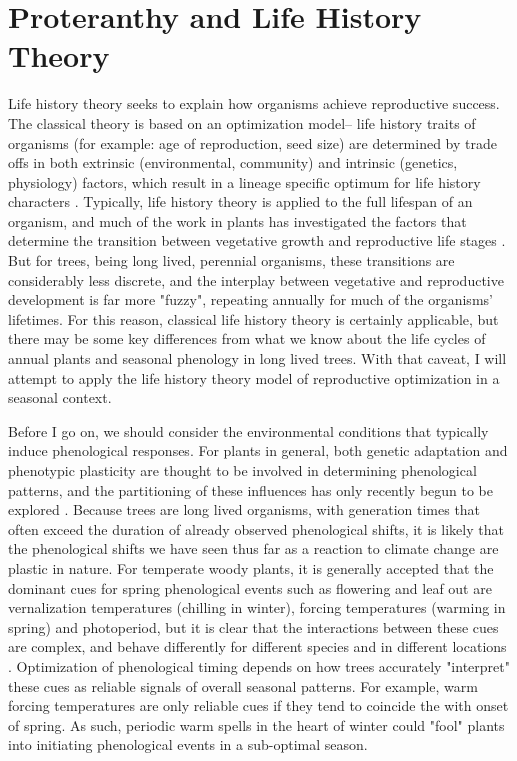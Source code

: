 \documentclass{article}\usepackage[]{graphicx}\usepackage[]{color}
\begin{document}
\section{Proteranthy and Life History Theory}
\par Life history theory seeks to explain how organisms achieve reproductive success. The classical theory is based on an optimization model-- life history traits of organisms (for example: age of reproduction, seed size) are determined by trade offs in both extrinsic (environmental, community) and intrinsic (genetics, physiology) factors, which result in a lineage specific optimum for life history characters \citep{Stearns2000}. Typically, life history theory is applied to the full lifespan of an organism, and much of the work in plants has investigated the factors that determine the transition between vegetative growth and reproductive life stages \citep{Glover2014}. But for trees, being long lived, perennial organisms, these transitions are considerably less discrete, and the interplay between vegetative and reproductive development is far more "fuzzy", repeating annually for much of the organisms' lifetimes. For this reason, classical life history theory is certainly applicable, but there may be some key differences from what we know about the life cycles of annual plants and seasonal phenology in long lived trees. With that caveat, I will attempt to apply the life history theory model of reproductive optimization in a seasonal context.
\par Before I go on, we should consider the environmental conditions that typically induce phenological responses. For plants in general, both genetic adaptation and phenotypic plasticity are thought to be involved in determining phenological patterns, and the partitioning of these influences has only recently begun to be explored \citep{Anderson2012}. Because trees are long lived organisms, with generation times that often exceed the duration of already observed phenological shifts, it is likely that the phenological shifts we have seen thus far as a reaction to climate change are plastic in nature. For temperate woody plants, it is generally accepted that the dominant cues for spring phenological events such as flowering and leaf out are vernalization temperatures (chilling in winter), forcing temperatures (warming in spring) and photoperiod, but it is clear that the interactions between these cues are complex, and behave differently for different species and in different locations \citep{Forrest2010}. Optimization of phenological timing depends on how trees accurately "interpret" these cues as reliable signals of overall seasonal patterns. For example, warm forcing temperatures are only reliable cues if they tend to coincide the with onset of spring. As such, periodic warm spells in the heart of winter could "fool" plants into initiating phenological events in a sub-optimal season. 
\end{document}
